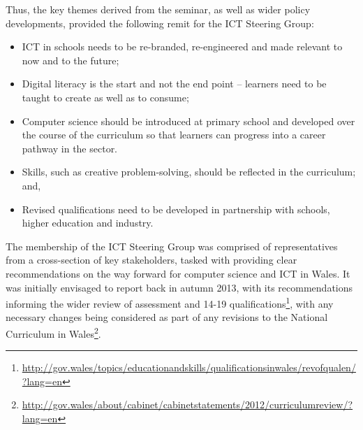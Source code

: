 \documentclass{sig-alternate}
\begin{document}
Thus, the key themes derived from the seminar, as well as wider policy
developments, provided the following remit for the ICT Steering Group:

\begin{itemize}
\item ICT in schools needs to be re-branded, re-engineered and made
relevant to now and to the future;
\item Digital literacy is the start and not the end point -- learners
need to be taught to create as well as to consume;
\item Computer science should be introduced at primary school and
developed over the course of the curriculum so that learners can
progress into a career pathway in the sector.
\item Skills, such as creative problem-solving, should be reflected in
the curriculum; and,
\item Revised qualifications need to be developed in partnership with
schools, higher education and industry.
\end{itemize}

The membership of the ICT Steering Group was comprised of
representatives from a cross-section of key
stakeholders, tasked with providing clear
recommendations on the way forward for computer science and ICT in
Wales. It was initially envisaged to report back in autumn 2013, with
its recommendations informing the wider review of assessment and 14-19
qualifications\footnote{\url{http://gov.wales/topics/educationandskills/qualificationsinwales/revofqualen/?lang=en}},
with any necessary changes being considered as part of any revisions
to the National Curriculum in
Wales\footnote{\url{http://gov.wales/about/cabinet/cabinetstatements/2012/curriculumreview/?lang=en}}.
\end{document}
